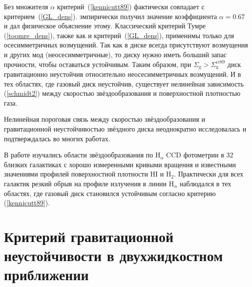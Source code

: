 \documentclass[russian,12pt]{article}
\begin{document}
Без множителя $\alpha$ критерий~(\ref{kennicutt89}) фактически совпадает 
с критерием~(\ref{GL_dens}). \cite{Kennicutt89} эмпирически получил 
значение коэффициента $\alpha = 0.67$ и дал физическое объяснение 
этому. Классический критерий Тумре (\ref{toomre_dens}), также как и 
критерий~(\ref{GL_dens}), применимы только 
для осесимметричных возмущений. Так как в диске всегда присутствуют 
возмущения и других мод (неосесимметричные), то диску нужно иметь 
больший запас прочности, чтобы оставаться устойчивым. Таким образом, 
при $\Sigma_\mathrm{g} > \Sigma_\mathrm{g}^\mathrm{cr89}$ диск
гравитационно неустойчив относительно неосесимметричных возмущений. 
И в тех областях, где газовый диск неустойчив, существует нелинейная 
зависимость (\ref{schmidt2}) между скоростью звёздообразования и поверхностной 
плотностью газа. 

Нелинейная пороговая связь между скоростью звёздообразования и 
гравитационной неустойчивостью звёздного диска неоднократно 
исследовалась и подтверждалась во многих работах.

В работе \cite{MK01} изучались области звёздообразования по 
$\mathrm{H}_{\alpha}$ CCD фотометрии в 32 близких галактиках с хорошо 
измеренными кривыми вращения и известными значениями профилей поверхностной 
плотности HI и H$_2$. Практически для всех галактик резкий обрыв на профиле 
излучения в линии $\mathrm{H}_{\alpha}$ наблюдался в тех областях, где 
газовый диск становился устойчивым согласно критерию (\ref{kennicutt89}).

\section{Критерий гравитационной неустойчивости в двухжидкостном 
приближении}
\end{document}
